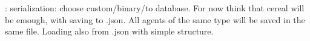 \begin{DoxyRefList}
\item[\label{_dev_stage1__DevStage1000010}%
\hypertarget{_dev_stage1__DevStage1000010}{}%
Member \hyperlink{classsolar__core_1_1_w_a08283dbea7c7f3fe8b7f094a96f73a78}{solar\+\_\+core\+:\+:W\+:\+:life\+\_\+hhs} ()]\+: serialization\+: choose custom/binary/to database. For now think that cereal will be emough, with saving to .json. All agents of the same type will be saved in the same file. Loading also from .json with simple structure.
\end{DoxyRefList}